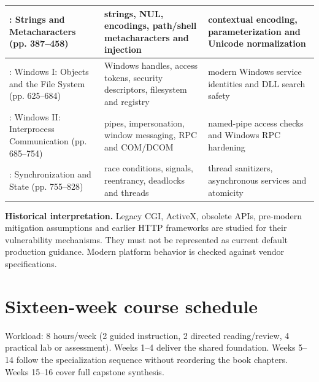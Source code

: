 \documentclass[10pt,letterpaper]{article}
\begin{document}
\begin{longtable}{>{\raggedright\arraybackslash}p{}>{\raggedright\arraybackslash}p{}>{\raggedright\arraybackslash}p{}}
8: Strings and Metacharacters (pp. 387--458) & strings, NUL, encodings, path/shell metacharacters and injection & contextual encoding, parameterization and Unicode normalization\\\midrule
11: Windows I: Objects and the File System (pp. 625--684) & Windows handles, access tokens, security descriptors, filesystem and registry & modern Windows service identities and DLL search safety\\\midrule
12: Windows II: Interprocess Communication (pp. 685--754) & pipes, impersonation, window messaging, RPC and COM/DCOM & named-pipe access checks and Windows RPC hardening\\\midrule
13: Synchronization and State (pp. 755--828) & race conditions, signals, reentrancy, deadlocks and threads & thread sanitizers, asynchronous services and atomicity\\\midrule
\bottomrule\end{longtable}\endgroup
\begin{historynote}\textbf{Historical interpretation.} Legacy CGI, ActiveX, obsolete APIs, pre-modern mitigation assumptions and earlier HTTP frameworks are studied for their vulnerability mechanisms. They must not be represented as current default production guidance. Modern platform behavior is checked against vendor specifications.\end{historynote}
\section{Sixteen-week course schedule}
Workload: 8 hours/week (2 guided instruction, 2 directed reading/review, 4 practical lab or assessment). Weeks 1--4 deliver the shared foundation. Weeks 5--14 follow the specialization sequence without reordering the book chapters. Weeks 15--16 cover full capstone synthesis.
\end{document}
